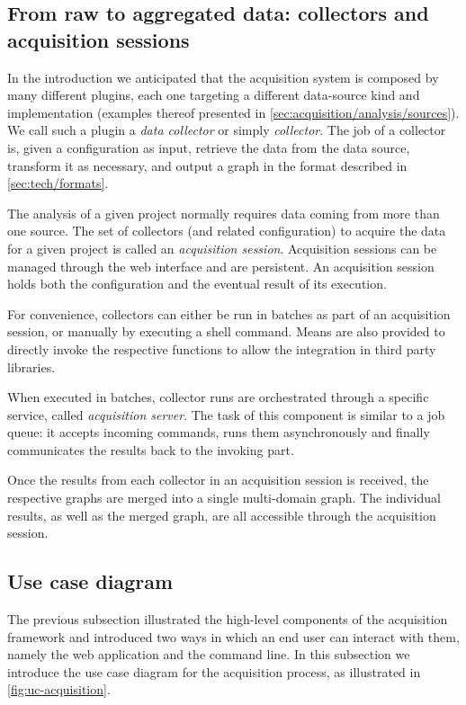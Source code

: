 \subsection{From raw to aggregated data: collectors and acquisition sessions}

In the introduction we anticipated that the acquisition system is composed by many different plugins, each one targeting a different data-source kind and implementation (examples thereof presented in \vref{sec:acquisition/analysis/sources}). We call such a plugin a \emph{data collector} or simply \emph{collector}. The job of a collector is, given a configuration as input, retrieve the data from the data source, transform it as necessary, and output a graph in the format described in \vref{sec:tech/formats}.

The analysis of a given project normally requires data coming from more than one source. The set of collectors (and related configuration) to acquire the data for a given project is called an \emph{acquisition session}. Acquisition sessions can be managed through the web interface and are persistent. An acquisition session holds both the configuration and the eventual result of its execution.

For convenience, collectors can either be run in batches as part of an acquisition session, or manually by executing a shell command. Means are also provided to directly invoke the respective functions to allow the integration in third party libraries.

When executed in batches, collector runs are orchestrated through a specific service, called \emph{acquisition server}. The task of this component is similar to a job queue: it accepts incoming commands, runs them asynchronously and finally communicates the results back to the invoking part.

Once the results from each collector in an acquisition session is received, the respective graphs are merged into a single multi-domain graph. The individual results, as well as the merged graph, are all accessible through the acquisition session.

\subsection{Use case diagram}

The previous subsection illustrated the high-level components of the acquisition framework and introduced two ways in which an end user can interact with them, namely the web application and the command line. In this subsection we introduce the use case diagram for the acquisition process, as illustrated in \vref{fig:uc-acquisition}.

